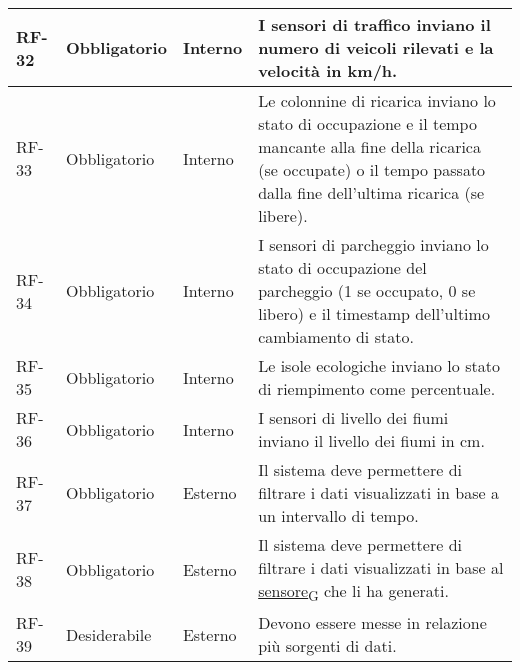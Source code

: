 \begin{longtable}{|>{\centering\arraybackslash}m{}|>{\centering\arraybackslash}m{}|>{\centering\arraybackslash}m{}|>{\centering\arraybackslash}m{}|}
	\\\hline
	RF-32           & Obbligatorio        & Interno                                                                                                           & I sensori di traffico inviano il numero di veicoli rilevati e la velocità in km/h.
	\\\hline
	RF-33           & Obbligatorio        & Interno                                                                                                           & Le colonnine di ricarica inviano lo stato di occupazione e il tempo mancante alla fine della ricarica (se occupate) o il tempo passato dalla fine dell'ultima ricarica (se libere).
	\\\hline
	RF-34           & Obbligatorio        & Interno                                                                                                           & I sensori di parcheggio inviano lo stato di occupazione del parcheggio (1 se occupato, 0 se libero) e il timestamp dell'ultimo cambiamento di stato.
	\\\hline
	RF-35           & Obbligatorio        & Interno                                                                                                           & Le isole ecologiche inviano lo stato di riempimento come percentuale.
	\\\hline
	RF-36           & Obbligatorio        & Interno                                                                                                           & I sensori di livello dei fiumi inviano il livello dei fiumi in cm.
	\\\hline
	RF-37           & Obbligatorio        & Esterno                                                                                                           & Il sistema deve permettere di filtrare i dati visualizzati in base a un intervallo di tempo.
	\\\hline
	RF-38           & Obbligatorio        & Esterno                                                                                                           & Il sistema deve permettere di filtrare i dati visualizzati in base al \href{https://7last.github.io/docs/pb/documentazione-interna/glossario\#sensore}{sensore\textsubscript{G}} che li ha generati.
	\\\hline
	RF-39           & Desiderabile        & Esterno                                                                                                           & Devono essere messe in relazione più sorgenti di dati.
	\\\hline

\end{longtable}
